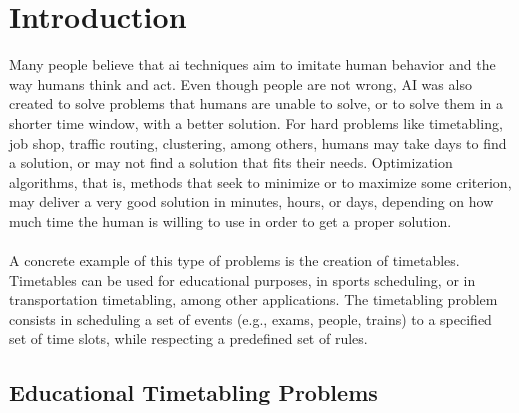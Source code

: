 \setcounter{secnumdepth}{2}
\chapter{Introduction}
\label{chap:Introduction}
\thispagestyle{plain}

Many people believe that \gls{ai} techniques aim to imitate human behavior and the way humans think and act. Even though people are not wrong, AI was also created to solve problems that humans are unable to solve, or to solve them in a shorter time window, with a better solution. For hard problems like timetabling, job shop, traffic routing, clustering, among others, humans may take days to find a solution, or may not find a solution that fits their needs. Optimization algorithms, that is, methods that seek to minimize or to maximize some criterion, may deliver a very good solution in minutes, hours, or days, depending on how much time the human is willing to use in order to get a proper solution.\\
\\
A concrete example of this type of problems is the creation of timetables. Timetables can be used for educational purposes, in sports scheduling, or in transportation timetabling, among other applications. The timetabling problem consists in scheduling a set of events (e.g., exams, people, trains) to a specified set of time slots, while respecting a predefined set of rules.

\section{Educational Timetabling Problems}

